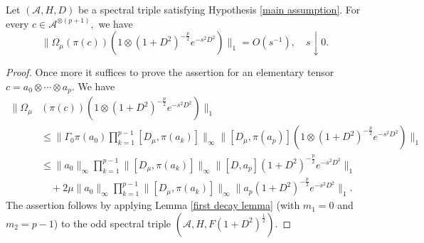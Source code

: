     \begin{lem}\label{third doubling lemma} 
        Let $(\mathcal{A},H,D)$ be a spectral triple satisfying Hypothesis \ref{main assumption}. 
        For every $c\in\mathcal{A}^{\otimes (p+1)},$ we have
        $$\Big\|\Omega_{\mu}(\pi(c))(1\otimes (1+D^2)^{-\frac{p}{2}}e^{-s^2D^2})\Big\|_1=O(s^{-1}),\quad s\downarrow0.$$
    \end{lem}
    \begin{proof} 
        Once more it suffices to prove the assertion for an elementary tensor $c=a_0\otimes\cdots\otimes a_p.$ We have
        \begin{align*}
              \Big\|\Omega_{\mu}&(\pi(c))(1\otimes (1+D^2)^{-\frac{p}{2}}e^{-s^2D^2})\Big\|_1\\
                                &\leq \Big\|\Gamma_0 \pi(a_0)\prod_{k=1}^{p-1}[D_{\mu},\pi(a_k)]\Big\|_{\infty}\Big\|[D_{\mu},\pi(a_p)](1\otimes (1+D^2)^{-\frac{p}{2}}e^{-s^2D^2})\Big\|_1\\
                                &\leq \|a_0\|_{\infty}\prod_{k=1}^{p-1}\|[D_{\mu},\pi(a_k)]\|_{\infty}\Big\|[D,a_p](1+D^2)^{-\frac{p}{2}}e^{-s^2D^2}\Big\|_1\\
                                &\quad +2\mu\|a_0\|_{\infty}\prod_{k=1}^{p-1}\|[D_{\mu},\pi(a_k)]\|_{\infty}\Big\|a_p(1+D^2)^{-\frac{p}{2}}e^{-s^2D^2}\Big\|_1.
        \end{align*}
        The assertion follows by applying Lemma \ref{first decay lemma} (with $m_1=0$ and $m_2=p-1$) to the odd spectral triple $(\mathcal{A},H,F(1+D^2)^{\frac12}).$    
    \end{proof}

